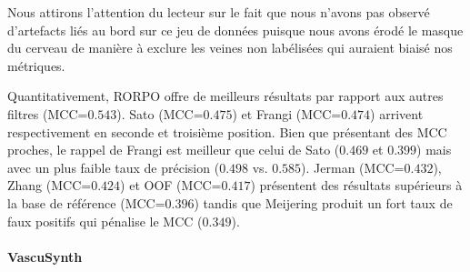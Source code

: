 Nous attirons l'attention du lecteur sur le fait que nous n'avons pas observé d'artefacts liés au bord sur ce jeu de données puisque nous avons érodé le masque du cerveau de manière à exclure les veines non labélisées qui auraient biaisé nos métriques. 

Quantitativement, RORPO offre de meilleurs résultats par rapport aux autres filtres (MCC=$0.543$). Sato (MCC=$0.475$) et Frangi (MCC=$0.474$) arrivent respectivement en seconde et troisième position. Bien que présentant des MCC proches, le rappel de Frangi est meilleur que celui de Sato  ($0.469$ et $0.399$) mais avec un plus faible taux de précision ($0.498$ vs. $0.585$). Jerman (MCC=$0.432$), Zhang (MCC=$0.424$) et OOF (MCC=$0.417$) présentent des résultats supérieurs à la base de référence (MCC=$0.396$) tandis que Meijering produit un fort taux de faux positifs qui pénalise le MCC ($0.349$).



\paragraph{VascuSynth}


